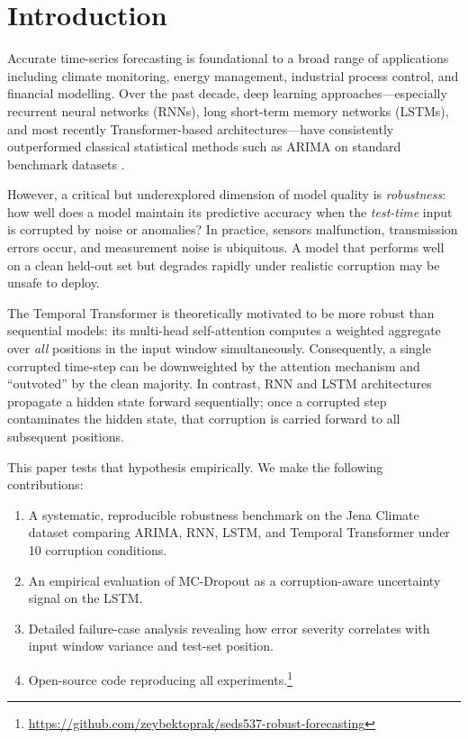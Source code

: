 \documentclass[runningheads]{llncs}
\begin{document}
\section{Introduction}
\label{sec:intro}

Accurate time-series forecasting is foundational to a broad range of applications including climate monitoring, energy management, industrial process control, and financial modelling. Over the past decade, deep learning approaches—especially recurrent neural networks (RNNs), long short-term memory networks (LSTMs), and most recently Transformer-based architectures—have consistently outperformed classical statistical methods such as ARIMA on standard benchmark datasets \cite{lim2021temporal,zhou2021informer}.

However, a critical but underexplored dimension of model quality is \emph{robustness}: how well does a model maintain its predictive accuracy when the \emph{test-time} input is corrupted by noise or anomalies? In practice, sensors malfunction, transmission errors occur, and measurement noise is ubiquitous. A model that performs well on a clean held-out set but degrades rapidly under realistic corruption may be unsafe to deploy.

The Temporal Transformer is theoretically motivated to be more robust than sequential models: its multi-head self-attention computes a weighted aggregate over \emph{all} positions in the input window simultaneously. Consequently, a single corrupted time-step can be downweighted by the attention mechanism and ``outvoted'' by the clean majority. In contrast, RNN and LSTM architectures propagate a hidden state forward sequentially; once a corrupted step contaminates the hidden state, that corruption is carried forward to all subsequent positions.

This paper tests that hypothesis empirically. We make the following contributions:

\begin{enumerate}
  \item A systematic, reproducible robustness benchmark on the Jena Climate dataset comparing ARIMA, RNN, LSTM, and Temporal Transformer under 10 corruption conditions.
  \item An empirical evaluation of MC-Dropout as a corruption-aware uncertainty signal on the LSTM.
  \item Detailed failure-case analysis revealing how error severity correlates with input window variance and test-set position.
  \item Open-source code reproducing all experiments.\footnote{\url{https://github.com/zeybektoprak/seds537-robust-forecasting}}
\end{enumerate}
\end{document}
